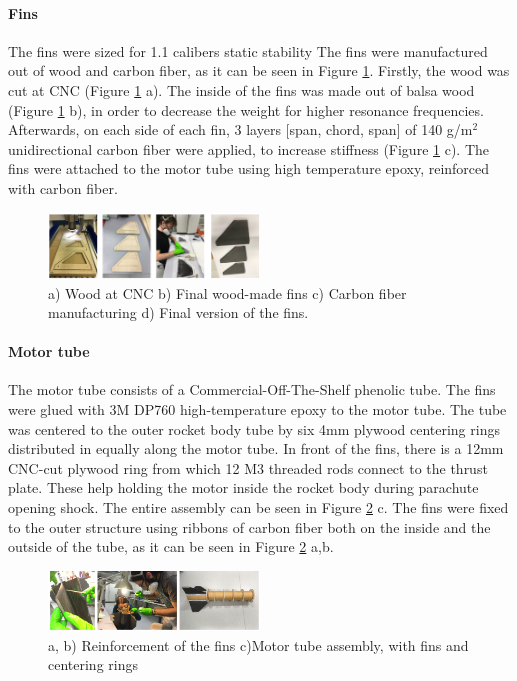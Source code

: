 \paragraph{Fins}
\hfill \break
    The fins were sized for 1.1 calibers static stability %
    The fins were manufactured out of wood and carbon fiber, as it can be seen in Figure \ref{f:fins}. Firstly, the wood was cut at CNC (Figure \ref{f:fins} a). The inside of the fins was made out of balsa wood (Figure \ref{f:fins} b), in order to decrease the weight for higher resonance frequencies. Afterwards, on each side of each fin, 3 layers [span, chord, span] of 140 g/m$^2$ unidirectional carbon fiber were applied, to increase stiffness (Figure \ref{f:fins} c). The fins were attached to the motor tube using high temperature epoxy, reinforced with carbon fiber.
    \begin{figure}[h!]
        \centering
        \includegraphics[width=0.5\textwidth]{img/fins.png}
        \caption{a) Wood at CNC b) Final wood-made fins c) Carbon fiber manufacturing d) Final version of the fins.}
        \label{f:fins}
    \end{figure}


\paragraph{Motor tube}
\hfill \break
The motor tube consists of a Commercial-Off-The-Shelf phenolic tube. The fins were glued with 3M DP760 high-temperature epoxy to the motor tube. The tube was centered to the outer rocket body tube by six 4mm plywood centering rings distributed in equally along the motor tube.
In front of the fins, there is a 12mm CNC-cut plywood ring from which 12 M3 threaded rods connect to the thrust plate. These help holding the motor inside the rocket body during parachute opening shock.
The entire assembly can be seen in Figure \ref{f:reinforcement} c. The fins were fixed to the outer structure using ribbons of carbon fiber both on the inside and the outside of the tube, as it can be seen in Figure \ref{f:reinforcement} a,b.

  \begin{figure}[h!]
\centering
\includegraphics[width=0.5\textwidth]{img/fins_glue.png}
\caption{a, b) Reinforcement of the fins c)Motor tube assembly, with fins and centering rings}
\label{f:reinforcement}
\end{figure}


